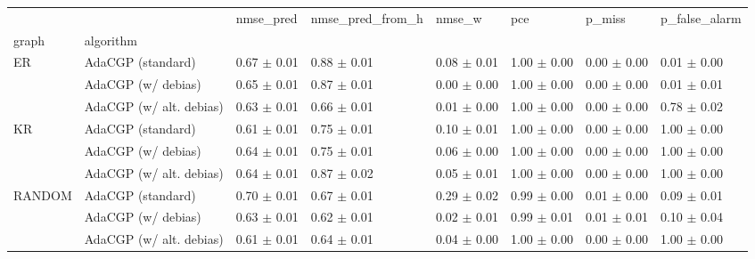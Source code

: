 \begin{tabular}{llllllll}
\toprule
       &                         &        nmse_pred & nmse_pred_from_h &           nmse_w &              pce &           p_miss &    p_false_alarm \\
graph & algorithm &                  &                  &                  &                  &                  &                  \\
\midrule
ER & AdaCGP (standard) &  0.67 $\pm$ 0.01 &  0.88 $\pm$ 0.01 &  0.08 $\pm$ 0.01 &  1.00 $\pm$ 0.00 &  0.00 $\pm$ 0.00 &  0.01 $\pm$ 0.00 \\
       & AdaCGP (w/ debias) &  0.65 $\pm$ 0.01 &  0.87 $\pm$ 0.01 &  0.00 $\pm$ 0.00 &  1.00 $\pm$ 0.00 &  0.00 $\pm$ 0.00 &  0.01 $\pm$ 0.01 \\
       & AdaCGP (w/ alt. debias) &  0.63 $\pm$ 0.01 &  0.66 $\pm$ 0.01 &  0.01 $\pm$ 0.00 &  1.00 $\pm$ 0.00 &  0.00 $\pm$ 0.00 &  0.78 $\pm$ 0.02 \\
KR & AdaCGP (standard) &  0.61 $\pm$ 0.01 &  0.75 $\pm$ 0.01 &  0.10 $\pm$ 0.01 &  1.00 $\pm$ 0.00 &  0.00 $\pm$ 0.00 &  1.00 $\pm$ 0.00 \\
       & AdaCGP (w/ debias) &  0.64 $\pm$ 0.01 &  0.75 $\pm$ 0.01 &  0.06 $\pm$ 0.00 &  1.00 $\pm$ 0.00 &  0.00 $\pm$ 0.00 &  1.00 $\pm$ 0.00 \\
       & AdaCGP (w/ alt. debias) &  0.64 $\pm$ 0.01 &  0.87 $\pm$ 0.02 &  0.05 $\pm$ 0.01 &  1.00 $\pm$ 0.00 &  0.00 $\pm$ 0.00 &  1.00 $\pm$ 0.00 \\
RANDOM & AdaCGP (standard) &  0.70 $\pm$ 0.01 &  0.67 $\pm$ 0.01 &  0.29 $\pm$ 0.02 &  0.99 $\pm$ 0.00 &  0.01 $\pm$ 0.00 &  0.09 $\pm$ 0.01 \\
       & AdaCGP (w/ debias) &  0.63 $\pm$ 0.01 &  0.62 $\pm$ 0.01 &  0.02 $\pm$ 0.01 &  0.99 $\pm$ 0.01 &  0.01 $\pm$ 0.01 &  0.10 $\pm$ 0.04 \\
       & AdaCGP (w/ alt. debias) &  0.61 $\pm$ 0.01 &  0.64 $\pm$ 0.01 &  0.04 $\pm$ 0.00 &  1.00 $\pm$ 0.00 &  0.00 $\pm$ 0.00 &  1.00 $\pm$ 0.00 \\
\bottomrule
\end{tabular}
